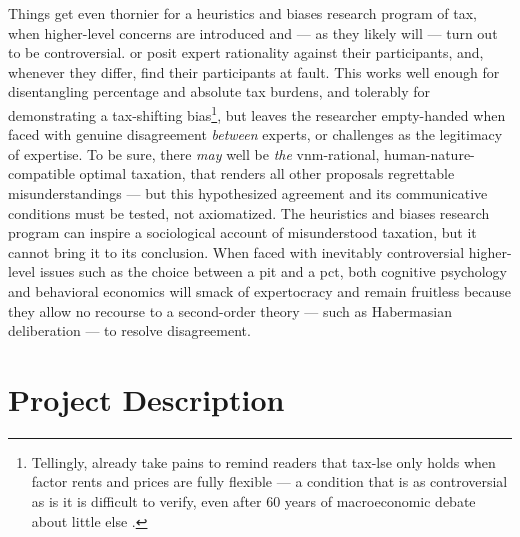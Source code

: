 \begin{enumerate}
	Things get even thornier for a heuristics and biases research program of tax, when higher-level concerns are introduced and --- as they likely will --- turn out to be controversial.
	\citeauthor{McCafferyBaron2004} or \citeauthor{SausgruberTyran2011} posit expert rationality against their participants, and, whenever they differ, find their participants at fault.
	This works well enough for disentangling percentage and absolute tax burdens, and tolerably for demonstrating a tax-shifting bias\footnote{
	Tellingly, \citeauthor{SausgruberTyran2011} already take pains to remind readers that \gls{tax-lse} only holds when factor rents and prices are fully flexible --- a condition that is as controversial as is it is difficult to verify, even after 60 years of macroeconomic debate about little else \citep{Wapshott2011}.},
	but leaves the researcher empty-handed when faced with genuine disagreement \emph{between} experts, or challenges as the legitimacy of expertise.
	To be sure, there \emph{may} well be \emph{the} \gls{vnm}-rational, human-nature-compatible optimal taxation, that renders all other proposals regrettable misunderstandings --- but this hypothesized agreement and its communicative conditions must be tested, not axiomatized.
	The heuristics and biases research program can inspire a sociological account of misunderstood taxation, but it cannot bring it to its conclusion.
	When faced with inevitably controversial higher-level issues such as the choice between a \gls{pit} and a \gls{pct}, both cognitive psychology and behavioral economics will smack of expertocracy and remain fruitless because they allow no recourse to a second-order theory \citep[125]{GutmannThompson-2004-aa} --- such as Habermasian deliberation --- to resolve disagreement.
\end{enumerate}

\section{Project Description}


